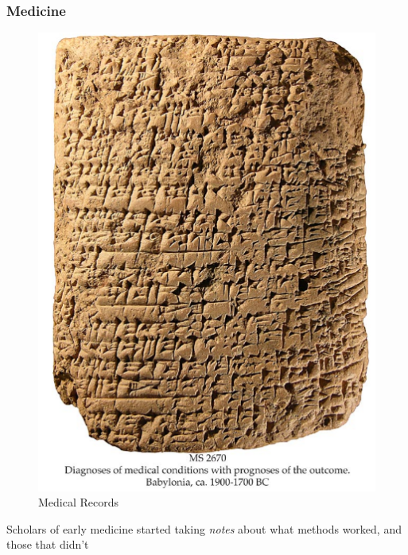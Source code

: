 \documentclass[11pt]{article}
\begin{document}
\subsubsection{Medicine}
\label{sec-3-8-6}
\begin{figure}[htb]
\centering
\includegraphics[width=.9\linewidth]{./img/MedRecs.png}
\caption{Medical Records}
\end{figure}

Scholars of early medicine started taking \emph{notes} about what methods worked, and those that didn't
\end{document}
